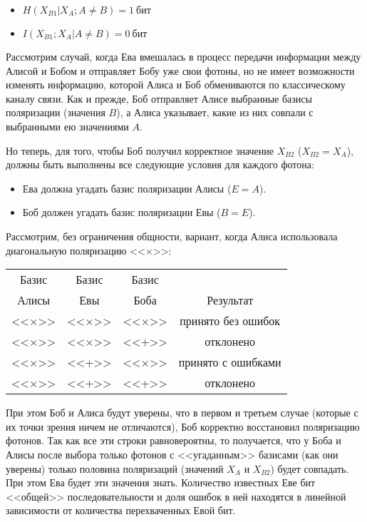 \begin{itemize}
	\item $H \left( X_{B1} | X_A; A \neq B \right) = 1~\text{бит}$
	\item $I \left( X_{B1} ; X_A | A \neq B \right) = 0~\text{бит}$
\end{itemize}

Рассмотрим случай, когда Ева вмешалась в процесс передачи информации между Алисой и Бобом и отправляет Бобу уже свои фотоны, но не имеет возможности изменять информацию, которой Алиса и Боб обмениваются по классическому каналу связи. Как и прежде, Боб отправляет Алисе выбранные базисы поляризации (значения $B$), а Алиса указывает, какие из них совпали с выбранными ею значениями $A$.

Но теперь, для того, чтобы Боб получил корректное значение $X_{B2}$ ($X_{B2} = X_A$), должны быть выполнены все следующие условия для каждого фотона:

\begin{itemize}
	\item Ева должна угадать базис поляризации Алисы ($E = A$).
	\item Боб должен угадать базис поляризации Евы ($B = E$).
\end{itemize}

Рассмотрим, без ограничения общности, вариант, когда Алиса использовала диагональную поляризацию <<×>>:

\begin{tabular}{ | c | c | c | c | }
\hline
Базис & Базис & Базис & \\
Алисы & Евы & Боба & Результат \\
\hline
<<×>> & <<×>> & <<×>> & принято без ошибок \\
<<×>> & <<×>> & <<+>> & отклонено \\
<<×>> & <<+>> & <<×>> & принято с ошибками\\
<<×>> & <<+>> & <<+>> & отклонено \\
\hline
\end{tabular}

При этом Боб и Алиса будут уверены, что в первом и третьем случае (которые с их точки зрения ничем не отличаются), Боб корректно восстановил поляризацию фотонов. Так как все эти строки равновероятны, то получается, что у Боба и Алисы после выбора только фотонов с <<угаданным>> базисами (как они уверены) только половина поляризаций (значений $X_A$ и $X_{B2}$) будет совпадать. При этом Ева будет эти значения знать. Количество известных Еве бит <<общей>> последовательности и доля ошибок в ней находятся в линейной зависимости от количества перехваченных Евой бит.

